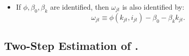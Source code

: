 \documentclass[
]{book}
\providecommand{\tightlist}{%
  \setlength{\itemsep}{0pt}\setlength{\parskip}{0pt}}
\begin{document}
\begin{itemize}
\tightlist
\item
  If \(\phi, \beta_0, \beta_k\) are identified, then \(\omega_{jt}\) is also identified by:
  \begin{equation}
  \omega_{jt} \equiv \phi(k_{jt}, i_{jt}) - \beta_0 - \beta_k k_{jt}.
  \end{equation}
\end{itemize}

\hypertarget{two-step-estimation-of-olley1996.}{%
\subsection{\texorpdfstring{Two-Step Estimation of \citet{Olley1996}.}{Two-Step Estimation of @Olley1996.}}\label{two-step-estimation-of-olley1996.}}
\end{document}

